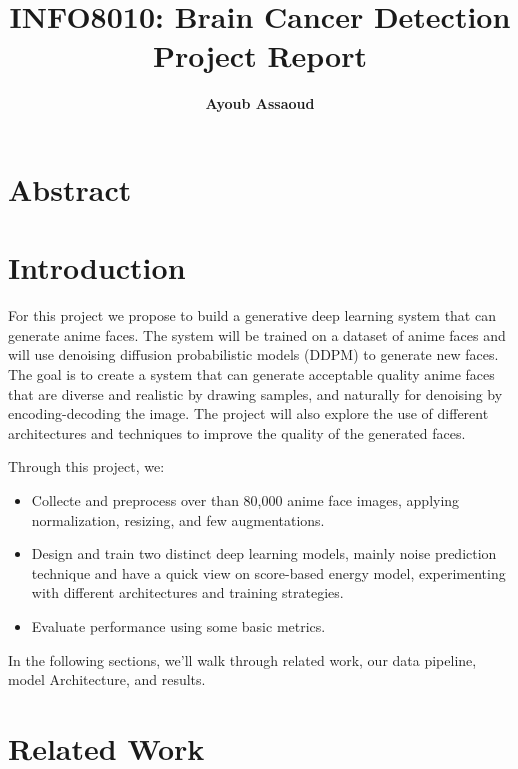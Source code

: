 \documentclass[twocolumn,superscriptaddress,aps]{revtex4-1}
\begin{document}

\title{\Large{INFO8010: Brain Cancer Detection Project Report}}
\vspace{1cm}
\author{\small{\bf Ayoub Assaoud}}

\maketitle
\section{Abstract}

\section{Introduction}

For this project we propose to build a generative deep learning system that can generate anime faces. The system will be trained on a dataset of anime faces and will use denoising diffusion probabilistic models (DDPM) to generate new faces. The goal is to create a system that can generate acceptable quality anime faces that are diverse and realistic by drawing samples, and naturally for denoising by encoding-decoding the image. The project will also explore the use of different architectures and techniques to improve the quality of the generated faces.

Through this project, we:

\begin{itemize}
        \item Collecte and preprocess over than 80,000 anime face images, applying normalization, resizing, and few augmentations.
        \item Design and train two distinct deep learning models, mainly noise prediction technique and have a quick view on score-based energy model, experimenting with different architectures and training strategies.
        \item Evaluate performance using some basic metrics.
\end{itemize}
In the following sections, we'll walk through related work, our data pipeline, model Architecture, and results.

\section{Related Work}
\end{document}
